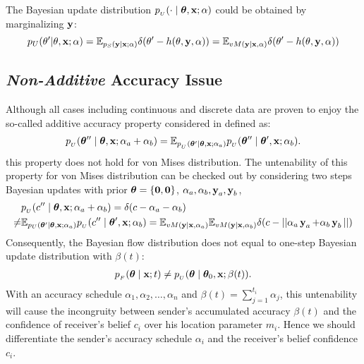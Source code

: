  The Bayesian update distribution $p_{_U}(\cdot \mid \boldsymbol{\theta}, \operatorname{\mathbf{x}}; \alpha)$ could be obtained by marginalizing $\operatorname{\mathbf{y}}$:
\begin{equation}
p_U(\theta'|\theta,\bold{x};\alpha)=\mathbb{E}_{p_S(\bold{y}|\bold{x};\alpha)}\delta(\theta'-h(\theta,\bold{y},\alpha))=\mathbb{E}_{vM(\bold{y}|\bold{x},\alpha)}\delta(\theta'-h(\theta,\bold{y},\alpha))
\end{equation}

\subsection{\textit{Non-Additive} Accuracy Issue }
Although all cases including continuous and discrete data are proven to enjoy the so-called additive accuracy property considered in \citet{bfn} defined as:
\begin{align}
p_{_U}(\boldsymbol{\theta}'' \mid \boldsymbol{\theta}, \operatorname{\mathbf{x}}; \alpha_a+\alpha_b) = \mathbb{E}_{p_{_U}(\boldsymbol{\theta}' \mid \boldsymbol{\theta}, \operatorname{\mathbf{x}}; \alpha_a)} p_{_U}(\boldsymbol{\theta}'' \mid \boldsymbol{\theta}', \operatorname{\mathbf{x}}; \alpha_b)\label{eq:additive}.
\end{align}
this property does not hold for von Mises distribution. The untenability of this property for von Mises distribution can be checked out by considering two steps Bayesian updates with prior $\bm{\theta} = \{\bold{0},\bold{0}\}$, $\alpha_a,\alpha_b, \operatorname{\mathbf{y}}_a, \operatorname{\mathbf{y}}_b$,
\begin{align}
    & p_{_U}(c'' \mid \boldsymbol{\theta}, \operatorname{\mathbf{x}}; \alpha_a+\alpha_b)  = \delta(c-\alpha_a-\alpha_b) \\
     \ne & \mathbb{E}_{p_U(\boldsymbol{\theta}' \mid \boldsymbol{\theta}, \operatorname{\mathbf{x}}; \alpha_a)} p_{_U}(c'' \mid \boldsymbol{\theta}', \operatorname{\mathbf{x}}; \alpha_b) = \mathbb{E}_{vM(\bold{y}|\bold{x},\alpha_a)}\mathbb{E}_{vM(\bold{y}|\bold{x},\alpha_b)}\delta(c-||\alpha_a \operatorname{\mathbf{y}}_a+\alpha_b \operatorname{\mathbf{y}}_b||)
\end{align}
Consequently, the Bayesian flow distribution does not equal to one-step Bayesian update distribution with $\beta(t)$:
\begin{align}
p_{_F}(\boldsymbol{\theta} \mid \operatorname{\mathbf{x}} ; t) \ne p_{_U}(\boldsymbol{\theta} \mid \boldsymbol{\theta}_{0}, \operatorname{\mathbf{x}}; \beta(t))\label{param_flow_dist}.
\end{align}
With an accuracy schedule $\alpha_1,\alpha_2,\dots,\alpha_n$ and $\beta(t)=\sum_{j=1}^{t_i} \alpha_j$, this untenability will cause the incongruity between sender's accumulated accuracy $\beta(t)$ and the confidence of receiver's belief $c_i$ over his location parameter $m_i$. Hence we should differentiate the sender's accuracy schedule $\alpha_i$ and the receiver's belief confidence$c_i$. 
